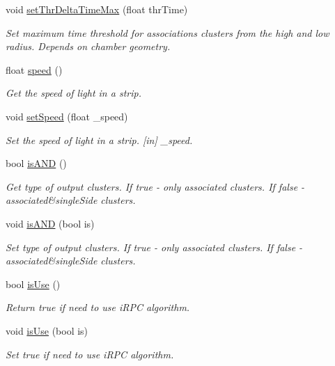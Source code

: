 \begin{DoxyCompactItemize}
void \hyperlink{classiRPCInfo_ab42a24a72e31cabc5eac0ec236005ea1}{set\-Thr\-Delta\-Time\-Max} (float thr\-Time)
\begin{DoxyCompactList}\small\item\em Set maximum time threshold for associations clusters from the high and low radius. Depends on chamber geometry. \end{DoxyCompactList}\item 
float \hyperlink{classiRPCInfo_af88bf411e22cfa4088b175dc0462c6be}{speed} ()
\begin{DoxyCompactList}\small\item\em Get the speed of light in a strip. \end{DoxyCompactList}\item 
\hypertarget{classiRPCInfo_aa13ce2c293d20669c7672e2ca31e77ec}{void \hyperlink{classiRPCInfo_aa13ce2c293d20669c7672e2ca31e77ec}{set\-Speed} (float \-\_\-speed)}\label{classiRPCInfo_aa13ce2c293d20669c7672e2ca31e77ec}

\begin{DoxyCompactList}\small\item\em Set the speed of light in a strip. \mbox{[}in\mbox{]} \-\_\-speed. \end{DoxyCompactList}\item 
bool \hyperlink{classiRPCInfo_a7f1003565aae261c6cf435c84883c053}{is\-A\-N\-D} ()
\begin{DoxyCompactList}\small\item\em Get type of output clusters. If true -\/ only associated clusters. If false -\/ associated\&single\-Side clusters. \end{DoxyCompactList}\item 
void \hyperlink{classiRPCInfo_aa01c91ada2a3d349b72fbabf1f96b920}{is\-A\-N\-D} (bool is)
\begin{DoxyCompactList}\small\item\em Set type of output clusters. If true -\/ only associated clusters. If false -\/ associated\&single\-Side clusters. \end{DoxyCompactList}\item 
bool \hyperlink{classiRPCInfo_ac8bc3677fea31aa951d43037baf517d5}{is\-Use} ()
\begin{DoxyCompactList}\small\item\em Return true if need to use i\-R\-P\-C algorithm. \end{DoxyCompactList}\item 
void \hyperlink{classiRPCInfo_a533f0c121e355975133b8e46d87166cd}{is\-Use} (bool is)
\begin{DoxyCompactList}\small\item\em Set true if need to use i\-R\-P\-C algorithm. \end{DoxyCompactList}\end{DoxyCompactItemize}


